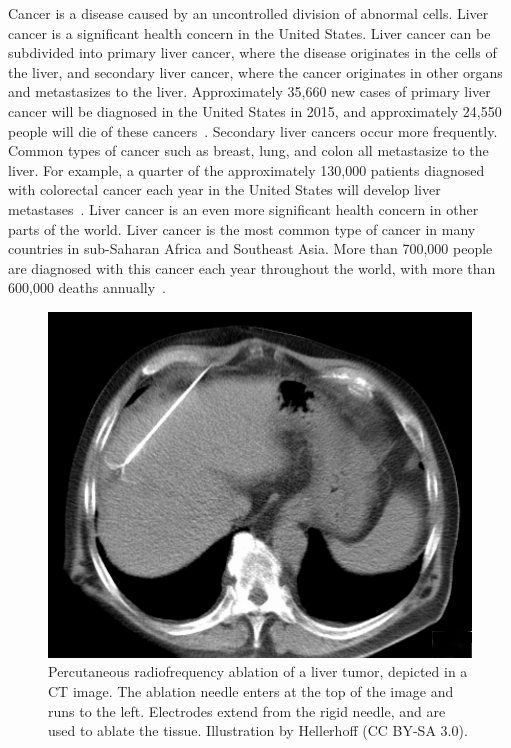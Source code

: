 Cancer is a disease caused by an uncontrolled division of abnormal cells. Liver cancer is a significant health concern in the United States. Liver cancer can be subdivided into primary liver cancer, where the disease originates in the cells of the liver, and secondary liver cancer, where the cancer originates in other organs and metastasizes to the liver. Approximately 35,660 new cases of primary liver cancer will be diagnosed in the United States in 2015, and approximately 24,550 people will die of these cancers~\cite{AmericanCancer2015}. Secondary liver cancers occur more frequently. Common types of cancer such as breast, lung, and colon all metastasize to the liver. For example, a quarter of the approximately 130,000 patients diagnosed with colorectal cancer each year in the United States will develop liver metastases~\cite{Ananthakrishnan2006,CDC2015,Haddad2011}. Liver cancer is an even more significant health concern in other parts of the world. Liver cancer is the most common type of cancer in many countries in sub-Saharan Africa and Southeast Asia. More than 700,000 people are diagnosed with this cancer each year throughout the world, with more than 600,000 deaths annually~\cite{AmericanCancer2015}.

\begin{figure}[!t]
\centering
\includegraphics[width = 0.7\columnwidth]{./Images/Chapter1/liverAblation.jpg}%
\caption[Percutaneous radiofrequency ablation of a liver tumor]{Percutaneous radiofrequency ablation of a liver tumor, depicted in a CT image. The ablation needle enters at the top of the image and runs to the left. Electrodes extend from the rigid needle, and are used to ablate the tissue. Illustration by Hellerhoff (CC BY-SA 3.0).}
\label{fig:Ch1LiverAblation}
\end{figure}   


